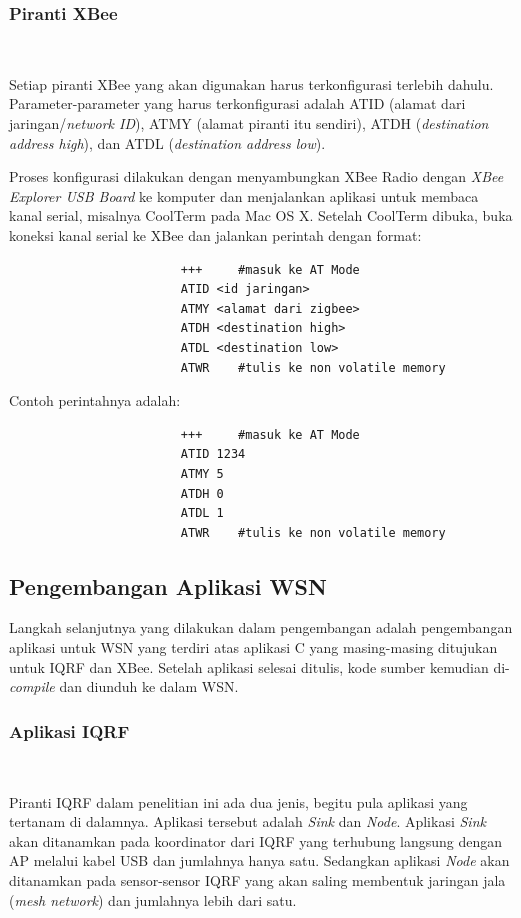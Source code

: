 			\subsubsection{Piranti XBee}\

				Setiap piranti XBee yang akan digunakan harus terkonfigurasi terlebih dahulu. Parameter-parameter yang harus terkonfigurasi adalah ATID (alamat dari jaringan/\emph{network ID}), ATMY (alamat piranti itu sendiri), ATDH (\emph{destination address high}), dan ATDL (\emph{destination address low}).

				Proses konfigurasi dilakukan dengan menyambungkan XBee Radio dengan \emph{XBee Explorer USB Board} ke komputer dan menjalankan aplikasi untuk membaca kanal serial, misalnya CoolTerm pada Mac OS X. Setelah CoolTerm dibuka, buka koneksi kanal serial ke XBee dan jalankan perintah dengan format:
				\begingroup
				    \fontsize{10pt}{12pt}\selectfont
				    \begin{verbatim}
						+++		#masuk ke AT Mode
						ATID <id jaringan>
						ATMY <alamat dari zigbee>
						ATDH <destination high>
						ATDL <destination low>
						ATWR 	#tulis ke non volatile memory
				    \end{verbatim}  
				\endgroup

				Contoh perintahnya adalah:
				\begingroup
				    \fontsize{10pt}{12pt}\selectfont
				    \begin{verbatim}
						+++		#masuk ke AT Mode
						ATID 1234
						ATMY 5
						ATDH 0
						ATDL 1
						ATWR 	#tulis ke non volatile memory
				    \end{verbatim}  
				\endgroup

		\subsection{Pengembangan Aplikasi WSN}
			Langkah selanjutnya yang dilakukan dalam pengembangan adalah pengembangan aplikasi untuk WSN yang terdiri atas aplikasi C yang masing-masing ditujukan untuk IQRF dan XBee. Setelah aplikasi selesai ditulis, kode sumber kemudian di-\emph{compile} dan diunduh ke dalam WSN.

			\subsubsection{Aplikasi IQRF}\

				Piranti IQRF dalam penelitian ini ada dua jenis, begitu pula aplikasi yang tertanam di dalamnya. Aplikasi tersebut adalah \emph{Sink} dan \emph{Node}. Aplikasi \emph{Sink} akan ditanamkan pada koordinator dari IQRF yang terhubung langsung dengan AP melalui kabel USB dan jumlahnya hanya satu. Sedangkan aplikasi \emph{Node} akan ditanamkan pada sensor-sensor IQRF yang akan saling membentuk jaringan jala (\emph{mesh network}) dan jumlahnya lebih dari satu.

